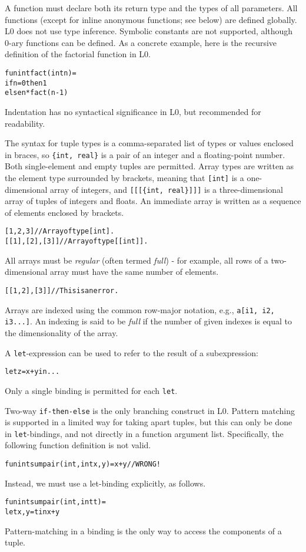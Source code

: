 \documentclass[oneside]{memoir}
\begin{document}
A function must declare both its return type and the types of all
parameters.  All functions (except for inline anonymous functions; see
below) are defined globally.  L0 does not use type inference.
Symbolic constants are not supported, although 0-ary functions can be
defined.  As a concrete example, here is the recursive definition of
the factorial function in L0.
\begin{alltt}
  fun int fact(int n) =
    if n = 0 then 1
             else n * fact(n-1)
\end{alltt}
Indentation has no syntactical significance in L0, but recommended for
readability.

The syntax for tuple types is a comma-separated list of types or
values enclosed in braces, so \texttt{\{int, real\}} is a pair of an
integer and a floating-point number.  Both single-element and empty
tuples are permitted.  Array types are written as the element type
surrounded by brackets, meaning that \texttt{[int]} is a
one-dimensional array of integers, and \texttt{[[[\{int, real\}]]]} is a
three-dimensional array of tuples of integers and floats.  An
immediate array is written as a sequence of elements enclosed by
brackets.
\begin{alltt}
  [1, 2, 3]       // Array of type [int].
  [[1], [2], [3]] // Array of type [[int]].
\end{alltt}
All arrays must be \emph{regular} (often termed \emph{full}) - for
example, all rows of a two-dimensional array must have the same number
of elements.
\begin{alltt}
  [[1, 2], [3]] // This is an error.
\end{alltt}
Arrays are indexed using the common row-major notation, 
e.g., \texttt{a[i1, i2, i3...]}.  An indexing is said to be \textit{full} if
the number of given indexes is equal to the dimensionality of the
array.

A \texttt{let}-expression can be used to refer to the result of a
subexpression:
\begin{alltt}
  let z = x + y in ...
\end{alltt}
Only a single binding is permitted for each \texttt{let}.

Two-way \texttt{if-then-else} is the only branching construct in L0.
Pattern matching is supported in a limited way for taking apart
tuples, but this can only be done in \texttt{let}-bindings, and not
directly in a function argument list.  Specifically, the following
function definition is not valid.
\begin{alltt}
  fun int sumpair({int, int} {x, y}) = x + y // WRONG!
\end{alltt}
Instead, we must use a let-binding explicitly, as follows.
\begin{alltt}
  fun int sumpair({int, int} t) =
    let {x,y} = t in x + y
\end{alltt}
Pattern-matching in a binding is the only way to access the components
of a tuple.
\end{document}
